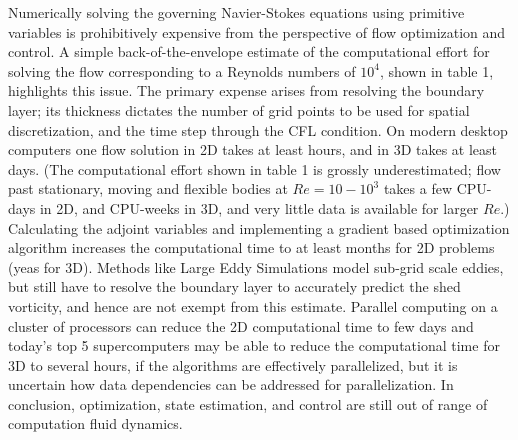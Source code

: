 Numerically solving the governing Navier-Stokes equations using primitive variables is prohibitively expensive from the perspective of flow optimization and control.
A simple back-of-the-envelope estimate of the computational effort for solving the flow corresponding to a Reynolds numbers of $10^4$, shown in table 1, highlights this issue.
The primary expense arises from resolving the boundary layer; its thickness dictates the number of grid points to be used for spatial discretization, and the time step through the CFL condition.
On modern desktop computers one flow solution in 2D takes at least hours, and in 3D takes at least days. (The computational effort shown in table 1 is grossly underestimated; flow past stationary, moving and flexible bodies at $Re = 10 - 10^3$ takes a few CPU-days in 2D, and CPU-weeks in 3D, and very little data is available for larger $Re$.)
Calculating the adjoint variables and implementing a gradient based optimization algorithm increases the computational time to at least months for 2D problems (yeas for 3D).
Methods like Large Eddy Simulations model sub-grid scale eddies, but still have to resolve the boundary layer to accurately predict the shed vorticity, and hence are not exempt from this estimate.
Parallel computing on a cluster of processors can reduce the 2D computational time to few days and today's top 5 supercomputers may be able to reduce the computational time for 3D to several hours, if the algorithms are effectively parallelized, but it is uncertain how data dependencies can be addressed for parallelization.
In conclusion, optimization, state estimation, and control are still out of range of computation fluid dynamics.

